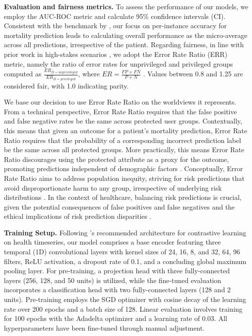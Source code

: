 \documentclass[letterpaper]{article} %
\newcommand{\rev}[1]{\textcolor[rgb]{0.00,0.00,0.00}{#1}}
\begin{document}
\noindent\textbf{Evaluation and fairness metrics.} To assess the performance of our models, we employ the AUC-ROC metric and calculate 95\% confidence intervals (CI). Consistent with the benchmark by \citet{harutyunyan2019multitask}, our focus on per-instance accuracy for mortality prediction leads to calculating overall performance as the micro-average across all predictions, irrespective of the patient. Regarding fairness, in line with prior work in high-stakes scenarios \cite{purdy2023pursuit}, we adopt the Error Rate Ratio (ERR) metric, namely the ratio of error rates for unprivileged and privileged groups computed as $\frac{ER_{D=unprivileged}}{ER_{D=privileged}}$, where $ER=\frac{FP+FN}{P+N}$ \cite{bellamy2019ai}. Values between 0.8 and 1.25 are considered fair, with 1.0 indicating parity.

\rev{We base our decision to use Error Rate Ratio on the worldviews it represents. From a technical perspective, Error Rate Ratio requires that the false positive and false negative rates be the same across protected user groups. Contextually, this means that given an outcome for a patient's mortality prediction, Error Rate Ratio requires that the probability of a corresponding incorrect prediction label be the same across all protected groups. More practically, this means Error Rate Ratio discourages using the protected attribute as a proxy for the outcome, promoting predictions independent of demographic factors \cite{hardt2016equality}. Conceptually, Error Rate Ratio aims to address population inequity, striving for risk predictions that avoid disproportionate harm to any group, irrespective of underlying risk distributions \cite{green2020false}.}
In the context of healthcare, \rev{balancing risk predictions is crucial}, given the potential consequences of false positives and false negatives and the ethical implications of \rev{risk} prediction disparities \cite{burt2017burden}.

\smallskip
\noindent\textbf{Training Setup.}
Following \citet{tang2020exploring}'s recommended architecture for contrastive learning on health timeseries, our model comprises a base encoder featuring three temporal (1D) convolutional layers with kernel sizes of 24, 16, 8, and 32, 64, 96 filters, ReLU activation, a dropout rate of 0.1, and a concluding global maximum pooling layer. For pre-training, a projection head with three fully-connected layers (256, 128, and 50 units) is utilized, while the fine-tuned evaluation incorporates a classification head with two fully-connected layers (128 and 2 units). Pre-training employs the SGD optimizer with cosine decay of the learning rate over 200 epochs and a batch size of 128. Linear evaluation involves training for 100 epochs with the Adadelta optimizer and a learning rate of 0.03.
All hyperparameters have been fine-tuned through manual adjustment.
\end{document}
